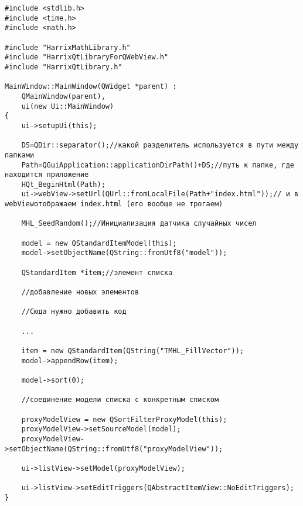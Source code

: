 \begin{itemize}
\begin{lstlisting}[label=examplefunction03, caption=mainwindow.cpp]
#include <stdlib.h>
#include <time.h>
#include <math.h>

#include "HarrixMathLibrary.h"
#include "HarrixQtLibraryForQWebView.h"
#include "HarrixQtLibrary.h"

MainWindow::MainWindow(QWidget *parent) :
    QMainWindow(parent),
    ui(new Ui::MainWindow)
{
    ui->setupUi(this);

    DS=QDir::separator();//какой разделитель используется в пути между папками
    Path=QGuiApplication::applicationDirPath()+DS;//путь к папке, где находится приложение
    HQt_BeginHtml(Path);
    ui->webView->setUrl(QUrl::fromLocalFile(Path+"index.html"));// и в webViewотображаем index.html (его вообще не трогаем)

    MHL_SeedRandom();//Инициализация датчика случайных чисел

    model = new QStandardItemModel(this);
    model->setObjectName(QString::fromUtf8("model"));

    QStandardItem *item;//элемент списка

    //добавление новых элементов
    
    //Сюда нужно добавить код
	
	...
    
    item = new QStandardItem(QString("TMHL_FillVector"));
    model->appendRow(item);

    model->sort(0);

    //соединение модели списка с конкретным списком

    proxyModelView = new QSortFilterProxyModel(this);
    proxyModelView->setSourceModel(model);
    proxyModelView->setObjectName(QString::fromUtf8("proxyModelView"));

    ui->listView->setModel(proxyModelView);

    ui->listView->setEditTriggers(QAbstractItemView::NoEditTriggers);
}
\end{lstlisting}


\end{itemize}
